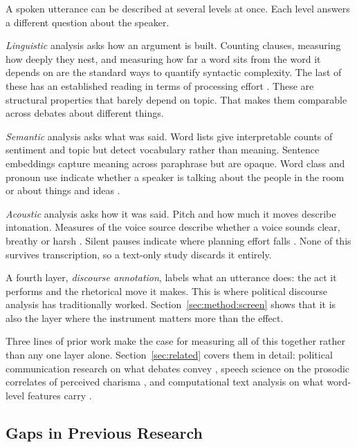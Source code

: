 \documentclass[pdflatex,sn-mathphys-num]{sn-jnl}%
\begin{document}
A spoken utterance can be described at several levels at once. Each
level answers a different question about the speaker.

\emph{Linguistic} analysis asks how an argument is built. Counting clauses,
measuring how deeply they nest, and measuring how far a word sits from the
word it depends on are the standard ways to quantify syntactic complexity.
The last of these has an established reading in terms of processing effort
\cite{gibson1998linguistic}. These are structural properties that barely
depend on topic. That makes them comparable across debates about
different things.

\emph{Semantic} analysis asks what was said. Word lists give interpretable
counts of sentiment and topic but detect vocabulary rather than meaning.
Sentence embeddings capture meaning across paraphrase but are opaque. Word
class and pronoun use indicate whether a speaker is talking about the
people in the room or about things and ideas \cite{pennebaker2014small}.

\emph{Acoustic} analysis asks how it was said. Pitch and how much it moves
describe intonation. Measures of the voice source describe whether a voice
sounds clear, breathy or harsh \cite{laver1980voice}. Silent pauses indicate
where planning effort falls
\cite{goldman1968psycholinguistics,levelt1989speaking}. None of this
survives transcription, so a text-only study discards it entirely.

A fourth layer, \emph{discourse annotation}, labels what an utterance does:
the act it performs and the rhetorical move it makes. This is where
political discourse analysis has traditionally worked. Section~\ref{sec:method:screen} shows that it is also the layer where the
instrument matters more than the effect.

Three lines of prior work make the case for measuring all of this together
rather than any one layer alone. Section~\ref{sec:related} covers them
in detail: political communication research on what debates convey
\cite{benoit2014debates}, speech science on the prosodic correlates of
perceived charisma \cite{rosenberg2009acoustic,hutto2018political}, and
computational text analysis on what word-level features carry
\cite{tausczik2010psychological,pennebaker2014small}.

\subsection{Gaps in Previous Research}
\label{sec:intro:gaps}
\end{document}
